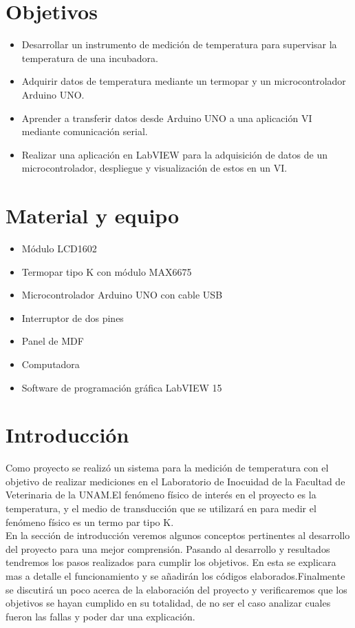 \section{Objetivos}
\begin{itemize}
    \item Desarrollar un instrumento de medición de temperatura para supervisar la temperatura de una incubadora.
    \item Adquirir datos de temperatura mediante un termopar y un microcontrolador Arduino UNO.
    \item Aprender a transferir datos desde Arduino UNO a una aplicación VI mediante comunicación serial.
    \item Realizar una aplicación en LabVIEW para la adquisición de datos de un microcontrolador, despliegue y visualización de estos en un VI.
\end{itemize}

\section{Material y equipo}
\begin{itemize}
    \item Módulo LCD1602
    \item Termopar tipo K con módulo MAX6675
    \item Microcontrolador Arduino UNO con cable USB
    \item Interruptor de dos pines
    \item Panel de MDF
    \item Computadora
    \item Software de programación gráfica LabVIEW 15
\end{itemize}

\section{Introducción}

Como proyecto se realizó un sistema para la medición de temperatura con el objetivo de realizar mediciones en el Laboratorio de Inocuidad de la Facultad de Veterinaria de la UNAM.El fenómeno físico de interés en el proyecto es la temperatura, y el medio de transducción que se utilizará en para medir el fenómeno físico es un termo par tipo K.\\

En la sección de introducción veremos algunos conceptos pertinentes al desarrollo del proyecto para una mejor comprensión. Pasando al desarrollo y resultados tendremos los pasos realizados para cumplir los objetivos. En esta se explicara mas a detalle el funcionamiento y se añadirán los códigos elaborados.Finalmente se discutirá un poco acerca de la elaboración del proyecto y verificaremos que los objetivos se hayan cumplido en su totalidad, de no ser el caso analizar cuales fueron las fallas y poder dar una explicación.

